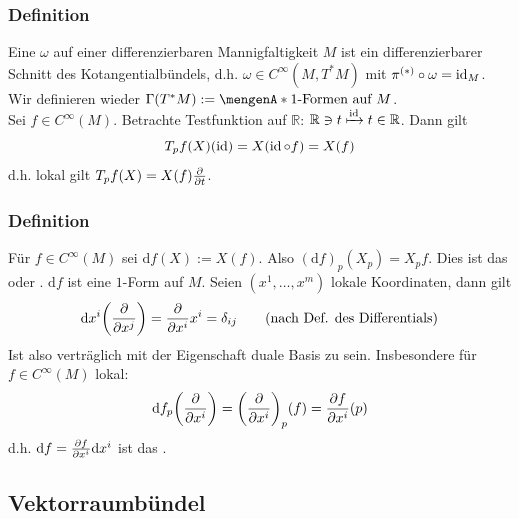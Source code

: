 \subsubsection[Definition: $1$-Form]{Definition} %
\label{ssub:421}
Eine  $\omega$ auf einer differenzierbaren Mannigfaltigkeit $M$ ist ein differenzierbarer Schnitt des Kotangentialbündels, d.h. 
$\omega \in C^\infty(M, T^*M)$ mit $\pi^{(*)} \circ \omega = \operatorname{id}_M$. Wir definieren wieder $\Gamma(T^*M) := \set{1 \text{-Formen auf }M}$. \smallskip \\
Sei $f \in C^\infty(M)$. Betrachte Testfunktion auf $\mathds{R}$: $\mathbb{R} \ni t \xmapsto{\operatorname{id}} t \in \mathbb{R}$. Dann gilt
\[
	T_p f (X) (\operatorname{id}) = X( \operatorname{id} \circ f) = X(f)
\]
d.h. lokal gilt $T_p f(X) = X(f) \frac{{\partial }}{{\partial t}} $.

\subsubsection[Definition: Totales Differential]{Definition} %
\label{ssub:422}
Für $f \in C^\infty(M)$ sei $\mathrm{d} f(X) := X(f)$. Also $(\mathrm{d}f)_p (X_p) = X_p f$. Dies ist das  oder 
. $\mathrm{d}f$ ist eine $1$-Form auf $M$. Seien $(x^1, \ldots , x^m)$ lokale Koordinaten, dann gilt
\[
	\mathrm{d}x^i \enbrace*{\diff{}{x^j} } = \diff{}{x^i} x^i = \delta_{ij}  \tag{nach Def. des Differentials}
\]
Ist also verträglich mit der Eigenschaft duale Basis zu sein. Insbesondere für $f \in C^\infty(M)$ lokal:
\[
	\mathrm{d} f_p \enbrace*{\diff{}{x^i} } = \enbrace*{\diff{}{x^i} }_p (f) = \diff{f}{x^i} (p)   
\]
d.h. $\mathrm{d} f = \frac{{\partial f}}{{\partial x^i}}  \mathrm{d}x^i $ ist das . 

\subsection{Vektorraumbündel} %
\label{sub:43}
